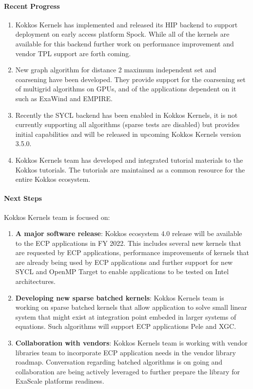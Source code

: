 \paragraph{Recent Progress}
\begin{enumerate}
\item Kokkos Kernels has implemented and released its HIP backend to support deployment on early
access platform Spock. While all of the kernels are available for this backend further work on
performance improvement and vendor TPL support are forth coming.
\item New graph algorithm for distance 2 maximum independent set and coarsening have been developed.
They provide support for the coarsening set of multigrid algorithms on GPUs, and of the applications
dependent on it such as ExaWind and EMPIRE.
\item Recently the SYCL backend has been enabled in Kokkos Kernels, it is not currently supporting all
algorithms (sparse tests are disabled) but provides initial capabilities and will be released in upcoming
Kokkos Kernels version 3.5.0.
\item Kokkos Kernels team has developed and integrated tutorial materials to the Kokkos tutorials. The
tutorials are maintained as a common resource for the entire Kokkos ecosystem.
\end{enumerate}

\paragraph{Next Steps}

Kokkos Kernels team is focused on:
\begin{enumerate}
	\item \textbf{A major software release}: Kokkos ecosystem 4.0 release 
	will be available to the ECP applications in FY 2022. This includes several new 
	kernels that are requested by ECP applications, performance improvements of
	kernels that are already being used by ECP applications and further support for
        new SYCL and OpenMP Target to enable applications to be tested on Intel architectures.
	\item \textbf{Developing new sparse batched kernels}: Kokkos Kernels team is working on
        sparse batched kernels that allow application to solve small linear system that might
        exist at integration point embeded in larger systems of equations. Such algorithms will
        support ECP applications Pele and XGC.
	\item \textbf{Collaboration with vendors}: Kokkos Kernels team is working with vendor
	libraries team to incorporate ECP application needs in the vendor library roadmap.
	Conversation regarding batched algorithms is on going and collaboration are being
        actively leveraged to further prepare the library for ExaScale platforms readiness.
\end{enumerate}
